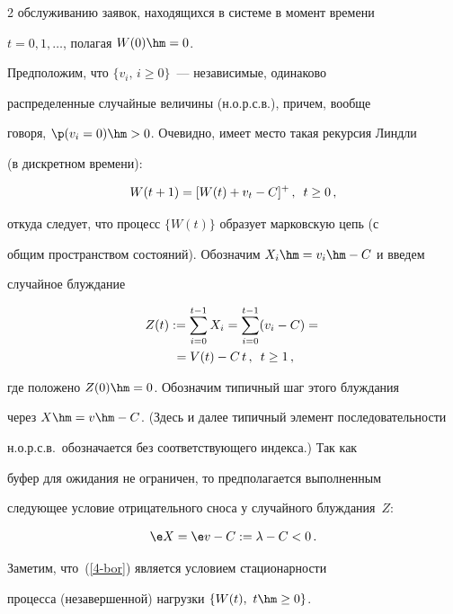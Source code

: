 \begin{multicols}{2}
обслуживанию заявок, находящихся в системе в момент  времени

$t=0,1,\ldots$, полагая  $W(0)\hm=0$.

 Предположим, что $\{v_i,\,i\ge 0\}$~--- независимые, одинаково

распределенные случайные величины (н.о.р.с.в.), причем,  вообще

говоря, $\p(v_i=0)\hm>0$. Очевидно, имеет место такая рекурсия Линдли

(в дискретном времени):

\begin{equation}

W(t+1)=[W(t)+v_{t}-C]^+\,,\enskip t\ge0\,,

\label{2-bor}

\end{equation}

откуда следует, что процесс $\{W(t)\}$ образует марковскую цепь (с

общим пространством состояний). Обозначим $X_i\hm=v_i\hm-C$ и введем

случайное  блуждание

\begin{multline}

Z(t):=\sum\limits_{i=0}^{t-1} X_i=\sum\limits_{i=0}^{t-1}(v_{i}-C)={}\\{}=V(t)-C\,

t\,,\enskip t\ge1\,,\label{3-bor}

\end{multline}

где положено   $Z(0)\hm=0$. Обозначим  типичный шаг этого блуждания

через $X\hm=v\hm-C$. (Здесь и далее типичный элемент последовательности

н.о.р.с.в.\ обозначается без соответствующего индекса.) Так как

буфер для ожидания не ограничен, то предполагается  выполненным

следующее условие отрицательного сноса у случайного блуждания~$Z$:

\begin{equation}

\e X=\e v- C:=\lambda-C<0\,. \label{4-bor}

\end{equation}

Заметим, что~(\ref{4-bor}) является условием стационарности

процесса (незавершенной) нагрузки $\{W(t),\ t\hm\ge 0\}$.


\end{multicols}
